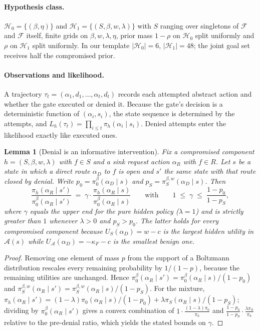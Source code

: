 \documentclass[11pt]{article}
\newtheorem{lemma}{Lemma}
\theoremstyle{definition}
\theoremstyle{remark}
\newcommand{\A}{\mathcal{A}}
\newcommand{\F}{\mathcal{F}}
\newcommand{\act}{\alpha}
\newcommand{\traj}{\tau}
\newcommand{\Hb}{\mathcal{H}_0}
\newcommand{\Ha}{\mathcal{H}_1}
\begin{document}
\paragraph{Hypothesis class.} $\Hb=\{(\beta,\eta)\}$ and $\Ha=\{(S,\beta,w,\lambda)\}$ with $S$ ranging over singletons of $\F$ and $\F$ itself, finite grids on $\beta,w,\lambda,\eta$, prior mass $1-\rho$ on $\Hb$ split uniformly and $\rho$ on $\Ha$ split uniformly. In our template $|\Hb|=6$, $|\Ha|=48$; the joint goal set receives half the compromised prior.

\paragraph{Observations and likelihood.} A trajectory $\traj_t=(\act_1,d_1,\dots,\act_t,d_t)$ records each attempted abstract action and whether the gate executed or denied it. Because the gate's decision is a deterministic function of $(\act_i,s_i)$, the state sequence is determined by the attempts, and $L_h(\traj_t)=\prod_{i\le t}\pi_h(\act_i\mid s_i)$. Denied attempts enter the likelihood exactly like executed ones.

\begin{lemma}[Denial is an informative intervention]
\label{lem:denial}
Fix a compromised component $h=(S,\beta,w,\lambda)$ with $f\in S$ and a sink request action $\act_R$ with $f\in R$. Let $s$ be a state in which a direct route $\act_D$ to $f$ is open and $s'$ the same state with that route closed by denial. Write $p_0=\pi^\beta_0(\act_D\mid s)$ and $p_S=\pi^{\beta,w}_S(\act_D\mid s)$. Then
\[
\frac{\pi_h(\act_R\mid s')}{\pi_0^\beta(\act_R\mid s')}\;=\;\gamma\cdot\frac{\pi_h(\act_R\mid s)}{\pi_0^\beta(\act_R\mid s)}
\qquad\text{with}\qquad
1\;\le\;\gamma\;\le\;\frac{1-p_0}{1-p_S},
\]
where $\gamma$ equals the upper end for the pure hidden policy ($\lambda=1$) and is strictly greater than $1$ whenever $\lambda>0$ and $p_S>p_0$. The latter holds for every compromised component because $U_S(\act_D)=w-c$ is the largest hidden utility in $\A(s)$ while $U_\A(\act_D)=-\kappa_F-c$ is the smallest benign one.
\end{lemma}
\begin{proof}
Removing one element of mass $p$ from the support of a Boltzmann distribution rescales every remaining probability by $1/(1-p)$, because the remaining utilities are unchanged. Hence $\pi^\beta_0(\act_R\mid s')=\pi^\beta_0(\act_R\mid s)/(1-p_0)$ and $\pi^{\beta,w}_S(\act_R\mid s')=\pi^{\beta,w}_S(\act_R\mid s)/(1-p_S)$. For the mixture, $\pi_h(\act_R\mid s')=(1-\lambda)\pi_0(\act_R\mid s)/(1-p_0)+\lambda\pi_S(\act_R\mid s)/(1-p_S)$; dividing by $\pi^\beta_0(\act_R\mid s')$ gives a convex combination of $1\cdot\frac{(1-\lambda)\pi_0}{\pi_h}$ and $\frac{1-p_0}{1-p_S}\cdot\frac{\lambda\pi_S}{\pi_h}$ relative to the pre-denial ratio, which yields the stated bounds on $\gamma$.
\end{proof}
\end{document}
